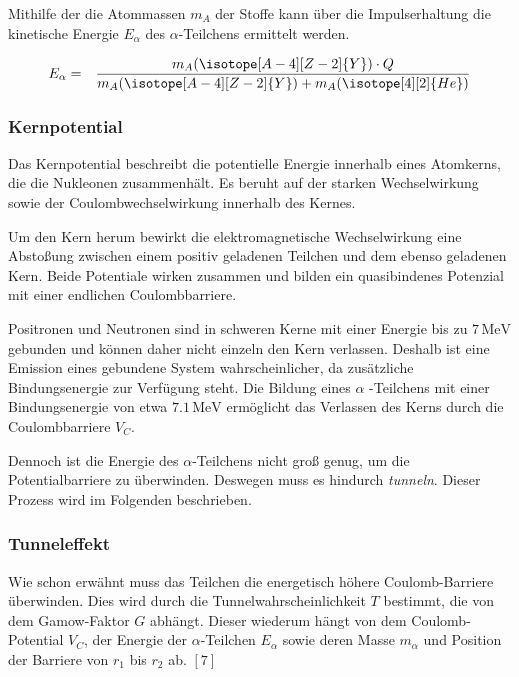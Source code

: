 \documentclass[12pt,a4paper]{scrartcl}
\numberwithin{equation}{section} %
\renewcommand{\[}{} %
\renewcommand{\]}{\noindent} %
\begin{document}
Mithilfe der die Atommassen \(m_{A}\) der Stoffe kann über die
Impulserhaltung die kinetische Energie \(E_\alpha\) des
\(\alpha\)-Teilchens ermittelt werden.

\[
\begin{eqnarray}
    E_\alpha
        &=& \frac{m_{A}(\isotope[A-4][Z-2]{Y}) \cdot Q}{m_{A}(\isotope[A-4][Z-2]{Y})+m_{A}(\isotope [4][2]{He})}
\end{eqnarray}
\]

\hypertarget{kernpotential}{%
\subsubsection{Kernpotential}\label{kernpotential}}

Das Kernpotential beschreibt die potentielle Energie innerhalb eines
Atomkerns, die die Nukleonen zusammenhält. Es beruht auf der starken
Wechselwirkung sowie der Coulombwechselwirkung innerhalb des Kernes.

Um den Kern herum bewirkt die elektromagnetische Wechselwirkung eine
Abstoßung zwischen einem positiv geladenen Teilchen und dem ebenso
geladenen Kern. Beide Potentiale wirken zusammen und bilden ein
quasibindenes Potenzial mit einer endlichen Coulombbarriere.

Positronen und Neutronen sind in schweren Kerne mit einer Energie bis zu
\(7\mathrm{\,MeV}\) gebunden und können daher nicht einzeln den Kern
verlassen. Deshalb ist eine Emission eines gebundene System
wahrscheinlicher, da zusätzliche Bindungsenergie zur Verfügung steht.
Die Bildung eines \(\alpha\) -Teilchens mit einer Bindungsenergie von
etwa \(7.1\mathrm{\,MeV}\) ermöglicht das Verlassen des Kerns durch die
Coulombbarriere \(V_C\).

Dennoch ist die Energie des \(\alpha\)-Teilchens nicht groß genug, um
die Potentialbarriere zu überwinden. Deswegen muss es hindurch
\emph{tunneln}. Dieser Prozess wird im Folgenden beschrieben.

\hypertarget{tunneleffekt}{%
\subsubsection{Tunneleffekt}\label{tunneleffekt}}

Wie schon erwähnt muss das Teilchen die energetisch höhere
Coulomb-Barriere überwinden. Dies wird durch die
Tunnelwahrscheinlichkeit \(T\) bestimmt, die von dem Gamow-Faktor \(G\)
abhängt. Dieser wiederum hängt von dem Coulomb-Potential \(V_C\), der
Energie der \(\alpha\)-Teilchen \(E_\alpha\) sowie deren Masse
\(m_\alpha\) und Position der Barriere von \(r_1\) bis \(r_2\) ab.
\([7]\)
\end{document}
